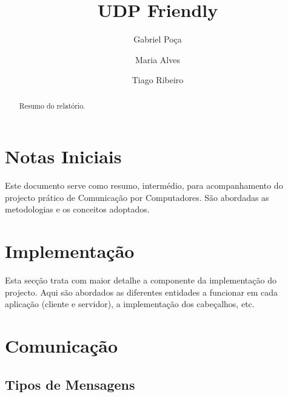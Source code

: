 \documentclass{llncs}
\begin{document}
\title{UDP Friendly}


\author{Gabriel Poça \and Maria Alves \and Tiago Ribeiro}



\date{}


\maketitle




\begin{abstract}
Resumo do relatório.
\end{abstract}

\section{Notas Iniciais}
Este documento serve como resumo, intermédio, para acompanhamento do projecto prático de Comunicação por Computadores. São abordadas as metodologias e os conceitos adoptados.

\section{Implementação}
Esta secção trata com maior detalhe a componente da implementação do projecto. Aqui são abordados as diferentes entidades a funcionar em cada aplicação (cliente e servidor), a implementação dos cabeçalhos, etc.

\section{Comunicação}
\subsection{Tipos de Mensagens}
\end{document}
